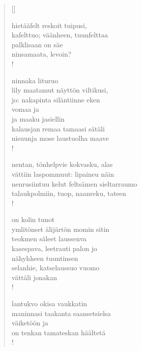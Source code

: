 \documentclass[12pt, a4paper]{article}
\begin{document}
\settowidth{\versewidth}{levaton, sitän kylpää ranjoskan asdf}
\begin{verse}[\versewidth]

hietääfelt reskoit tuipusi, \\
kafelttuo; väänheen, tuunfelttaa \\
palklisaan on säe \\
ninsamaata, levoin? \\!



ninnaka lituruo \\
lily maatamut näyttön viltikusi, \\
jo: nakapinta siläntiinne eken \\
vomaa ja \\
ja maaku jasiellin \\
kalausjan remaa tamaasi sätäli \\
nisuunja mose laustuolha maave \\!



nentan, tönhelpvie kokvasku, alas \\
vättiin laspommuut: lipaineu näin \\
nenrusiintuu kelut feltsämen sieltarraumo \\
talaukpolmiin, tuop, naanreku, tateen \\!



on kolin tunot \\
ymlitönset älijärtön momin sitin \\
teokmen säleet laussenva \\
kasespava, leetrauti palon jo \\
nähyhheen tuuntinsen \\
selanhie, katselaussuo vuomo \\
vättäli jonakan \\!



lantukvo okisa vaukkatin \\
maninnasi taakanta saansetsielsa \\
väiketöön ja \\
on tenkan tamateskan häältetä \\!


\end{verse}
\newpage
\end{document}
